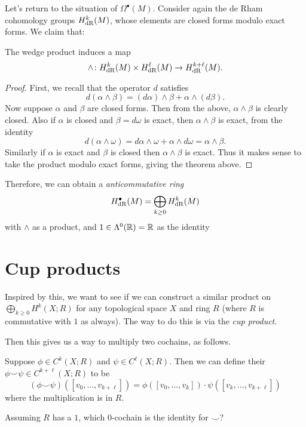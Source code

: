 Let's return to the situation of $\Omega^\bullet(M)$.
Consider again the de Rham cohomology groups $H_{\mathrm{dR}}^k(M)$,
whose elements are closed forms modulo exact forms.
We claim that:
\begin{lemma}
	The wedge product induces a map
	\[ \wedge \colon H_{\mathrm{dR}}^k(M) \times H_{\mathrm{dR}}^\ell(M) \to H_{\mathrm{dR}}^{k+\ell}(M). \]
\end{lemma}
\begin{proof}
	First, we recall that the operator $d$ satisfies
	\[
		d(\alpha \wedge \beta)
		= (d\alpha) \wedge \beta + \alpha \wedge (d\beta).
	\]
	Now suppose $\alpha$ and $\beta$ are closed forms.
	Then from the above, $\alpha \wedge \beta$ is clearly closed.
	Also if $\alpha$ is closed and $\beta = d\omega$ is exact,
	then $\alpha \wedge \beta$ is exact, from the identity
	\[ d(\alpha \wedge \omega)
		= d\alpha \wedge\omega + \alpha \wedge d\omega = \alpha \wedge \beta. \]
	Similarly if $\alpha$ is exact and $\beta$ is closed
	then $\alpha \wedge \beta$ is exact.
	Thus it makes sense to take the product modulo exact forms,
	giving the theorem above.
\end{proof}

Therefore, we can obtain a \emph{anticommutative ring}
\[ H_{\mathrm{dR}}^\bullet(M) = \bigoplus_{k \ge 0} H_{\mathrm{dR}}^k(M) \]
with $\wedge$ as a product, and $1 \in \Lambda^0(\mathbb R) = \mathbb R$ as the identity

\section{Cup products}
Inspired by this, we want to see if we can construct a similar product
on $\bigoplus_{k \ge 0} H^k(X; R)$ for any topological space $X$ and ring $R$
(where $R$ is commutative with $1$ as always).
The way to do this is via the \emph{cup product}.

Then this gives us a way to multiply two cochains, as follows.
\begin{definition}
	Suppose $\phi \in C^k(X;R)$ and $\psi \in C^\ell(X;R)$.
	Then we can define their 
	$\phi\smile\psi \in C^{k+\ell}(X;R)$ to be
	\[
		(\phi\smile\psi)([v_0, \dots, v_{k+\ell}])
		=
		\phi\left( [v_0, \dots, v_k] \right)
		\cdot
		\psi\left( [v_k, \dots, v_{k+\ell}] \right)
	\]
	where the multiplication is in $R$.
\end{definition}

\begin{ques}
	Assuming $R$ has a $1$, which $0$-cochain is the identity for $\smile$?
\end{ques}

